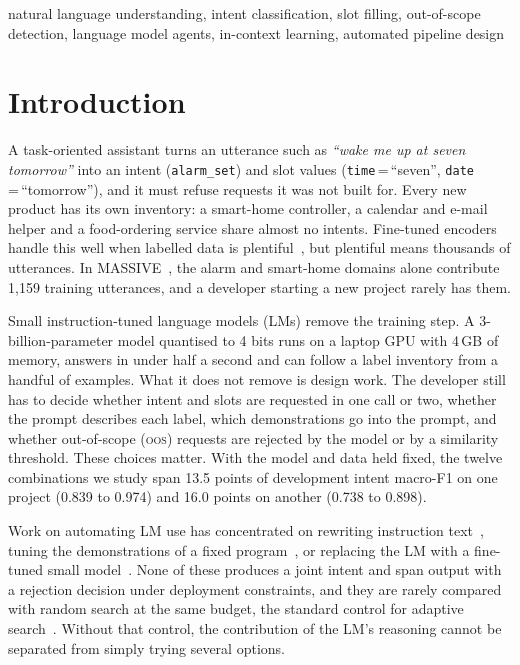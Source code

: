 \documentclass[conference]{IEEEtran}
\newcommand{\oos}{\textsc{oos}}
\begin{document}
\begin{IEEEkeywords}
natural language understanding, intent classification, slot filling, out-of-scope detection, language model agents, in-context learning, automated pipeline design
\end{IEEEkeywords}

\section{Introduction}

A task-oriented assistant turns an utterance such as \emph{``wake me up at seven tomorrow''} into an intent (\texttt{alarm\_set}) and slot values (\texttt{time}\,=\,``seven'', \texttt{date}\,=\,``tomorrow''), and it must refuse requests it was not built for. Every new product has its own inventory: a smart-home controller, a calendar and e-mail helper and a food-ordering service share almost no intents. Fine-tuned encoders handle this well when labelled data is plentiful~\cite{chen2019bert,conneau2020unsupervised}, but plentiful means thousands of utterances. In MASSIVE~\cite{fitzgerald2023massive}, the alarm and smart-home domains alone contribute 1{,}159 training utterances, and a developer starting a new project rarely has them.

Small instruction-tuned language models (LMs) remove the training step. A 3-billion-parameter model quantised to 4 bits runs on a laptop GPU with 4\,GB of memory, answers in under half a second and can follow a label inventory from a handful of examples. What it does not remove is design work. The developer still has to decide whether intent and slots are requested in one call or two, whether the prompt describes each label, which demonstrations go into the prompt, and whether out-of-scope (\oos) requests are rejected by the model or by a similarity threshold. These choices matter. With the model and data held fixed, the twelve combinations we study span 13.5 points of development intent macro-F1 on one project (0.839 to 0.974) and 16.0 points on another (0.738 to 0.898).

Work on automating LM use has concentrated on rewriting instruction text~\cite{zhou2023large,pryzant2023automatic,yang2024large}, tuning the demonstrations of a fixed program~\cite{khattab2024dspy}, or replacing the LM with a fine-tuned small model~\cite{viswanathan2023prompt2model}. None of these produces a joint intent and span output with a rejection decision under deployment constraints, and they are rarely compared with random search at the same budget, the standard control for adaptive search~\cite{bergstra2012random}. Without that control, the contribution of the LM's reasoning cannot be separated from simply trying several options.
\end{document}
